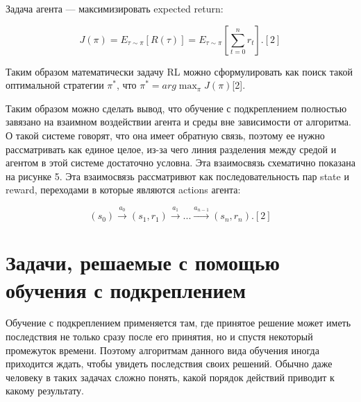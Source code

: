 \documentclass[bachelor, och, referat]{shiza}
\begin{document}
Задача агента — максимизировать expected return:

\begin{equation}
    J(\pi)=E_{\tau\sim\pi}[R(\tau)]=E_{\tau\sim\pi} \left[\sum_{t=0}^n r_t\right]. [2]
\end{equation}

Таким образом математически задачу RL можно сформулировать как поиск такой оптимальной стратегии $\pi^*$, что $\pi^* = arg \mathop {max} _ \pi J(\pi)$[2].

Таким образом можно сделать вывод, что обучение с подкреплением полностью завязано на взаимном воздействии агента и среды вне зависимости от алгоритма.
О такой системе говорят, что она имеет обратную связь, поэтому ее нужно рассматривать как единое целое, из-за чего линия разделения между средой и агентом
в этой системе достаточно условна. Эта взаимосвязь схематично показана на рисунке 5. Эта взаимосвязь рассматривют как последовательность пар state и
reward, переходами в которые являются actions агента:

\begin{equation}
    (s_0) \stackrel{a_0}{\rightarrow} (s_1, r_1) \stackrel{a_1}{\rightarrow} ... \stackrel{a_{n-1}}{\rightarrow} (s_n, r_n). [2]
\end{equation}

\section{Задачи, решаемые с помощью обучения с подкреплением}
Обучение с подкреплением применяется там, где принятое решение может иметь последствия не только сразу после его принятия,
но и спустя некоторый промежуток времени. Поэтому алгоритмам данного вида обучения иногда приходится ждать, чтобы
увидеть последствия своих решений. Обычно даже человеку в таких задачах сложно понять, какой порядок действий приводит к
какому результату.
\end{document}
